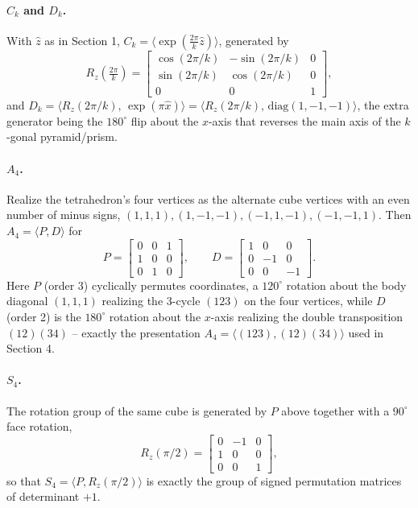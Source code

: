 \documentclass{amsart}
\theoremstyle{plain}
\theoremstyle{definition}
\begin{document}
\paragraph{$C_k$ and $D_k$.} With $\hat z$ as in Section 1, $C_k=\langle \exp(\tfrac{2\pi}{k}\hat z)\rangle$, generated by
\begin{equation*}
    R_z\left(\tfrac{2\pi}{k}\right)=\begin{bmatrix}\cos(2\pi/k) & -\sin(2\pi/k) & 0\\ \sin(2\pi/k) & \cos(2\pi/k) & 0\\ 0&0&1\end{bmatrix},
\end{equation*}
and $D_k=\langle R_z(2\pi/k),\, \exp(\pi\hat x)\rangle = \langle R_z(2\pi/k),\, \mathrm{diag}(1,-1,-1)\rangle$, the extra generator being the $180^\circ$ flip about the $x$-axis that reverses the main axis of the $k$-gonal pyramid/prism.

\paragraph{$A_4$.} Realize the tetrahedron's four vertices as the alternate cube vertices with an even number of minus signs, $(1,1,1),(1,-1,-1),(-1,1,-1),(-1,-1,1)$. Then $A_4=\langle P,D\rangle$ for
\begin{equation*}
    P=\begin{bmatrix}0&0&1\\1&0&0\\0&1&0\end{bmatrix}, \qquad D=\begin{bmatrix}1&0&0\\0&-1&0\\0&0&-1\end{bmatrix}.
\end{equation*}
Here $P$ (order 3) cyclically permutes coordinates, a $120^\circ$ rotation about the body diagonal $(1,1,1)$ realizing the 3-cycle $(123)$ on the four vertices, while $D$ (order 2) is the $180^\circ$ rotation about the $x$-axis realizing the double transposition $(12)(34)$ -- exactly the presentation $A_4=\langle(123),(12)(34)\rangle$ used in Section 4.

\paragraph{$S_4$.} The rotation group of the same cube is generated by $P$ above together with a $90^\circ$ face rotation,
\begin{equation*}
    R_z(\pi/2)=\begin{bmatrix}0&-1&0\\1&0&0\\0&0&1\end{bmatrix},
\end{equation*}
so that $S_4=\langle P,R_z(\pi/2)\rangle$ is exactly the group of signed permutation matrices of determinant $+1$.
\end{document}
